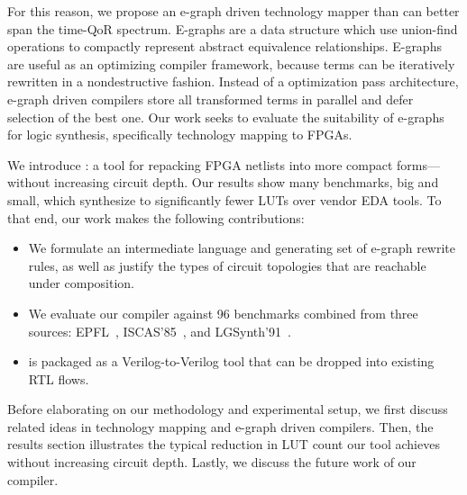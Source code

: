 For this reason, we propose an e-graph driven technology mapper than can better
span the time-QoR spectrum. E-graphs are a data structure which use union-find
operations to compactly represent abstract equivalence relationships. E-graphs
are useful as an optimizing compiler framework, because terms can be
iteratively rewritten in a nondestructive fashion. Instead of a optimization
pass architecture, e-graph driven compilers store all transformed terms in
parallel and defer selection of the best one. Our work seeks to evaluate the
suitability of e-graphs for logic synthesis, specifically technology mapping to
FPGAs.

We introduce \shortname{}: a tool for repacking FPGA netlists into more compact
forms---without increasing circuit depth. Our results show many benchmarks, big
and small, which synthesize to significantly fewer LUTs over vendor EDA tools.
To that end, our work makes the following contributions:

\begin{itemize}
    \item We formulate an intermediate language and generating set of e-graph rewrite
          rules, as well as justify the types of circuit topologies that are reachable
          under composition.
    \item We evaluate our compiler against 96 benchmarks combined from three sources:
          EPFL~\cite{epflbench}, ISCAS'85~\cite{iscasbench}, and
          LGSynth'91~\cite{lgsynthbench}.
    \item \shortname{} is packaged as a Verilog-to-Verilog tool that can be dropped into existing RTL flows.
\end{itemize}

Before elaborating on our methodology and experimental setup, we first discuss
related ideas in technology mapping and e-graph driven compilers. Then, the
results section illustrates the typical reduction in LUT count our tool
achieves without increasing circuit depth. Lastly, we discuss the future work
of our compiler.